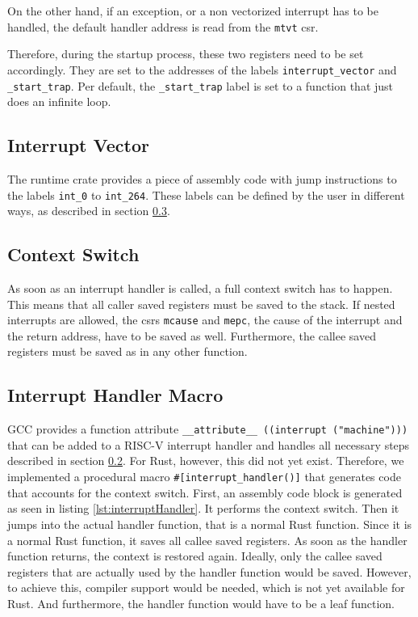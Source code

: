 On the other hand, if an exception, or a non vectorized interrupt has to be handled, the default handler address is read from the \texttt{mtvt} \gls{csr}.

Therefore, during the startup process, these two registers need to be set accordingly. They are set to the addresses of the labels \texttt{interrupt_vector} and \texttt{_start_trap}. Per default, the \texttt{_start_trap} label is set to a function that just does an infinite loop.

\subsection{Interrupt Vector}
\label{sec:vector_table}
The runtime crate provides a piece of assembly code with jump instructions to the labels \texttt{int_0} to \texttt{int_264}. These labels can be defined by the user in different ways, as described in section \ref{sec:interrupt_handler_macro}.

\subsection{Context Switch}
\label{sec:context_switch}
As soon as an interrupt handler is called, a full context switch has to happen. This means that all caller saved registers must be saved to the stack. If nested interrupts are allowed, the \gls{csr}s \texttt{mcause} and \texttt{mepc}, the cause of the interrupt and the return address, have to be saved as well. Furthermore, the callee saved registers must be saved as in any other function.

\subsection{Interrupt Handler Macro}
\label{sec:interrupt_handler_macro}
GCC provides a function attribute \texttt{__attribute__ ((interrupt ("machine")))} that can be added to a RISC-V interrupt handler and handles all necessary steps described in section \ref{sec:context_switch}. For Rust, however, this did not yet exist. Therefore, we implemented a procedural macro \texttt{\#[interrupt_handler()]} that generates code that accounts for the context switch.
First, an assembly code block is generated as seen in listing \ref{lst:interruptHandler}.
It performs the context switch. Then it jumps into the actual handler function, that is a normal Rust function. Since it is a normal Rust function, it saves all callee saved registers.
As soon as the handler function returns, the context is restored again.
Ideally, only the callee saved registers that are actually used by the handler function would be saved. However, to achieve this, compiler support would be needed, which is not yet available for Rust. And furthermore, the handler function would have to be a leaf function.

